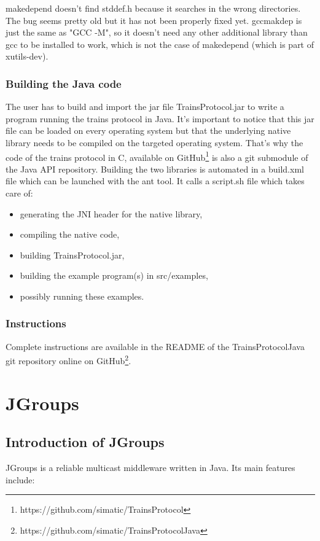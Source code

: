 \documentclass[a4paper,10pt]{report}
\begin{document}
makedepend doesn't find stddef.h because it searches in the wrong directories.
    The bug seems pretty old but it has not been properly fixed yet.
    gccmakdep is just the same as "GCC -M", so it doesn't need any
    other additional library than gcc to be installed to work, which is not
    the case of makedepend (which is part of xutils-dev).

\subsection{Building the Java code}

The user has to build and import the jar file TrainsProtocol.jar to write a program running the trains protocol in Java.
It's important to notice that this jar file can be loaded on every operating system but that the underlying native library needs to be compiled on the targeted operating system.
That's why the code of the trains protocol in C, available on GitHub\footnote{https://github.com/simatic/TrainsProtocol} is also a git submodule of the Java API repository.
Building the two libraries is automated in a build.xml file which can be launched with the ant tool. It calls a script.sh file which takes care of: 
\begin{itemize}
\item generating the JNI header for the native library, 
\item compiling the native code,
\item building TrainsProtocol.jar,
\item building the example program(s) in src/examples,
\item possibly running these examples.
\end{itemize}        



\subsection{Instructions}

Complete instructions are available in the README of the TrainsProtocolJava git repository online on GitHub\footnote{https://github.com/simatic/TrainsProtocolJava}.

\chapter{JGroups}
\section{Introduction of JGroups}
JGroups is a reliable multicast middleware written in Java. Its main features include\cite{jgroups}:
\end{document}
